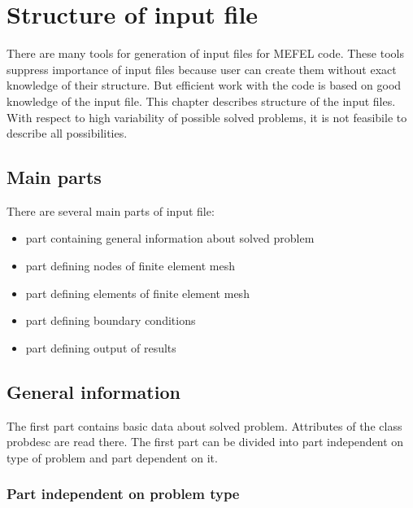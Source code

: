 \chapter{Structure of input file}

There are many tools for generation of input files for MEFEL code. These tools
suppress importance of input files because user can create them without exact
knowledge of their structure. But efficient work with the code is based on
good knowledge of the input file. This chapter describes structure of the input
files. With respect to high variability of possible solved problems, it is not
feasibile to describe all possibilities.

\section{Main parts}

There are several main parts of input file:

\begin{itemize}
\item{part containing general information about solved problem}
\item{part defining nodes of finite element mesh}
\item{part defining elements of finite element mesh}
\item{part defining boundary conditions}
\item{part defining output of results}
\end{itemize}

\section{General information}

The first part contains basic data about solved problem. Attributes of the class {\sf probdesc}
are read there. The first part can be divided into part independent on type of problem and part
dependent on it.

\subsection{Part independent on problem type}


